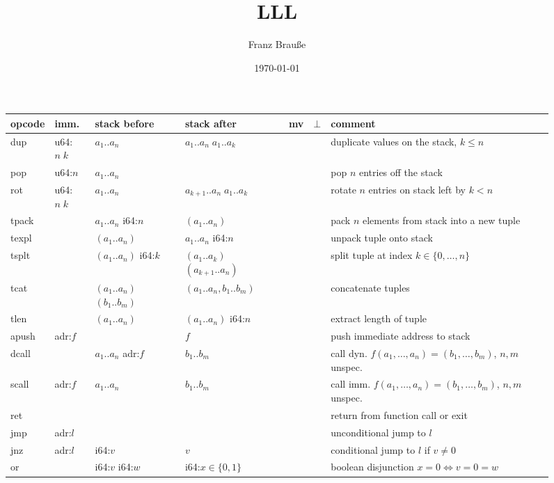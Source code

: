 \documentclass[a4paper,parskip=half]{scrartcl}
\author{Franz Brauße}
\title{LLL}
\date{\today}
\begin{document}
\begin{figure}[h]
\centering
\begin{tabular}{l|l|l|l@{\;\,\vline\,}c@{\,\vline\,}c@{\,\vline\;\,}l}
  opcode & imm. & stack before & stack after & mv & $\bot$ & comment \\ \hline
  \ttfamily dup & u64:$n\;k$ & $a_1..a_n$ & $a_1..a_n\;a_1..a_k$     &&& duplicate values on the stack, $k\leq n$ \\
  \ttfamily pop & u64:$n$    & $a_1..a_n$ &                          &&& pop $n$ entries off the stack \\
  \ttfamily rot & u64:$n\;k$ & $a_1..a_n$ & $a_{k+1}..a_n\;a_1..a_k$ &&& rotate $n$ entries on stack left by $k<n$ \\
  \hline
  \ttfamily tpack &         & $a_1..a_n$ i64:$n$        & $(a_1..a_n)$                  &&& pack $n$ elements from stack into a new tuple \\
  \ttfamily texpl &         & $(a_1..a_n)$              & $a_1..a_n$ i64:$n$            &&& unpack tuple onto stack \\
  \ttfamily tsplt &         & $(a_1..a_n)$ i64:$k$      & $(a_1..a_k)$ $(a_{k+1}..a_n)$ &&& split tuple at index $k\in\{0,\ldots,n\}$ \\
  \ttfamily tcat  &         & $(a_1..a_n)$ $(b_1..b_m)$ & $(a_1..a_n,b_1..b_m)$         &&& concatenate tuples \\
  \ttfamily tlen  &         & $(a_1..a_n)$              & $(a_1..a_n)$ i64:$n$          &&& extract length of tuple \\
  \hline
  \ttfamily apush & adr:$f$ &                    & $f$        &&& push immediate address to stack \\
  \ttfamily dcall &         & $a_1..a_n$ adr:$f$ & $b_1..b_m$ &&& call dyn. $f(a_1,\ldots,a_n) = (b_1,\ldots,b_m)$, $n,m$ unspec. \\
  \ttfamily scall & adr:$f$ & $a_1..a_n$         & $b_1..b_m$ &&& call imm. $f(a_1,\ldots,a_n) = (b_1,\ldots,b_m)$, $n,m$ unspec. \\
  \ttfamily ret   &         &                    &            &&& return from function call or exit \\
  \ttfamily jmp   & adr:$l$ &                    &            &&& unconditional jump to $l$ \\
  \ttfamily jnz   & adr:$l$ & i64:$v$            & $v$        &&& conditional jump to $l$ if $v\neq 0$ \\
  \hline
  \ttfamily or    &         & i64:$v$ i64:$w$ & i64:$x\in\{0,1\}$ &&& boolean disjunction $x=0\iff v=0=w$ \\

\end{tabular}
\end{figure}
\end{document}
